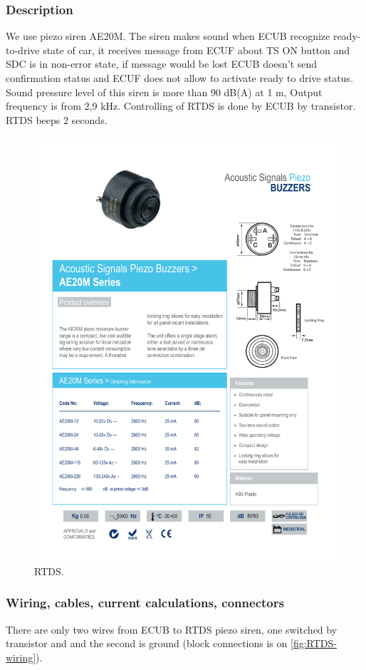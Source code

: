 
\subsubsection{Description}

We use piezo siren AE20M. The siren makes sound when ECUB recognize ready-to-drive state of car, it receives message from ECUF about TS ON button and SDC is in non-error state, if message would be lost ECUB doesn’t send confirmation status and ECUF does not allow to activate ready to drive status. Sound pressure level of this siren is more than 90 dB(A) at 1 m, Output frequency is from 2,9 kHz. Controlling of RTDS is done by ECUB by transistor. RTDS beeps 2 seconds.

\begin{figure}[H]
	\centering
	\includegraphics[width=.5\textwidth]{./img/RTDS.pdf}
	\caption{RTDS.}
	\label{fig:RTDS}
\end{figure}

\subsubsection{Wiring, cables, current calculations, connectors}

There are only two wires from ECUB to RTDS piezo siren, one switched by transistor and and the second is ground (block connections is on \ref{fig:RTDS-wiring}).

